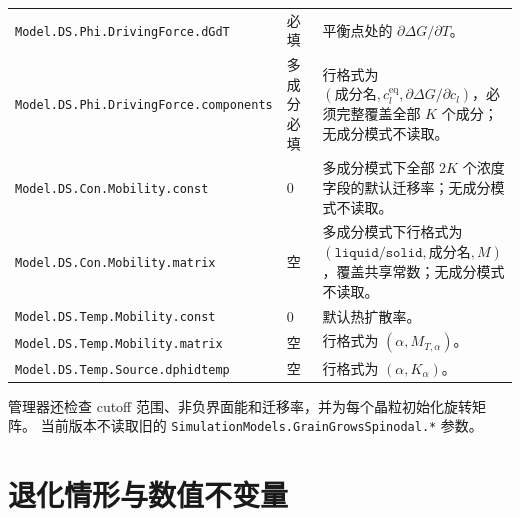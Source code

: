 \documentclass[UTF8,a4paper,11pt]{ctexart}
\begin{document}
\begin{longtable}{p{}p{}p{}}
\texttt{Model.DS.Phi.DrivingForce.dGdT}
  & 必填 & 平衡点处的 \(\partial\Delta G/\partial T\)。\\
\texttt{Model.DS.Phi.DrivingForce.components}
  & 多成分必填 & 行格式为 \((\text{成分名},c_l^{\mathrm{eq}},\partial\Delta G/\partial c_l)\)，必须完整覆盖全部 \(K\) 个成分；无成分模式不读取。\\
\texttt{Model.DS.Con.Mobility.const}
  & \(0\) & 多成分模式下全部 \(2K\) 个浓度字段的默认迁移率；无成分模式不读取。\\
\texttt{Model.DS.Con.Mobility.matrix}
  & 空 & 多成分模式下行格式为 \((\texttt{liquid/solid},\text{成分名},M)\)，覆盖共享常数；无成分模式不读取。\\
\texttt{Model.DS.Temp.Mobility.const}
  & \(0\) & 默认热扩散率。\\
\texttt{Model.DS.Temp.Mobility.matrix}
  & 空 & 行格式为 \((\alpha,M_{T,\alpha})\)。\\
\texttt{Model.DS.Temp.Source.dphidtemp}
  & 空 & 行格式为 \((\alpha,K_\alpha)\)。\\
\bottomrule
\end{longtable}

管理器还检查 cutoff 范围、非负界面能和迁移率，并为每个晶粒初始化旋转矩阵。
当前版本不读取旧的
\texttt{SimulationModels.GrainGrowsSpinodal.*} 参数。

\section{退化情形与数值不变量}
\end{document}
